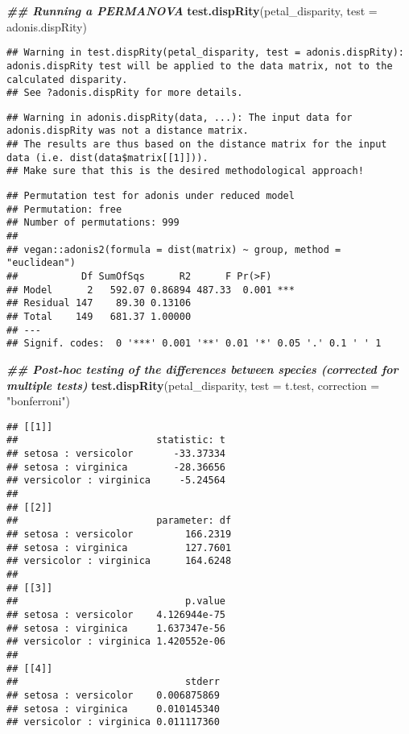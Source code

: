 \documentclass[
]{book}
\newenvironment{Shaded}{\begin{snugshade}}{\end{snugshade}}
\newcommand{\AttributeTok}[1]{\textcolor[rgb]{0.13,0.29,0.53}{#1}}
\newcommand{\DocumentationTok}[1]{\textcolor[rgb]{0.56,0.35,0.01}{\textbf{\textit{#1}}}}
\newcommand{\FunctionTok}[1]{\textcolor[rgb]{0.13,0.29,0.53}{\textbf{#1}}}
\newcommand{\NormalTok}[1]{#1}
\newcommand{\StringTok}[1]{\textcolor[rgb]{0.31,0.60,0.02}{#1}}
\begin{document}
\begin{Shaded}
\begin{Highlighting}[]
\DocumentationTok{\#\# Running a PERMANOVA}
\FunctionTok{test.dispRity}\NormalTok{(petal\_disparity, }\AttributeTok{test =}\NormalTok{ adonis.dispRity)}
\end{Highlighting}
\end{Shaded}

\begin{verbatim}
## Warning in test.dispRity(petal_disparity, test = adonis.dispRity): adonis.dispRity test will be applied to the data matrix, not to the calculated disparity.
## See ?adonis.dispRity for more details.
\end{verbatim}

\begin{verbatim}
## Warning in adonis.dispRity(data, ...): The input data for adonis.dispRity was not a distance matrix.
## The results are thus based on the distance matrix for the input data (i.e. dist(data$matrix[[1]])).
## Make sure that this is the desired methodological approach!
\end{verbatim}

\begin{verbatim}
## Permutation test for adonis under reduced model
## Permutation: free
## Number of permutations: 999
## 
## vegan::adonis2(formula = dist(matrix) ~ group, method = "euclidean")
##           Df SumOfSqs      R2      F Pr(>F)    
## Model      2   592.07 0.86894 487.33  0.001 ***
## Residual 147    89.30 0.13106                  
## Total    149   681.37 1.00000                  
## ---
## Signif. codes:  0 '***' 0.001 '**' 0.01 '*' 0.05 '.' 0.1 ' ' 1
\end{verbatim}

\begin{Shaded}
\begin{Highlighting}[]
\DocumentationTok{\#\# Post{-}hoc testing of the differences between species (corrected for multiple tests)}
\FunctionTok{test.dispRity}\NormalTok{(petal\_disparity, }\AttributeTok{test =}\NormalTok{ t.test, }\AttributeTok{correction =} \StringTok{"bonferroni"}\NormalTok{)}
\end{Highlighting}
\end{Shaded}

\begin{verbatim}
## [[1]]
##                        statistic: t
## setosa : versicolor       -33.37334
## setosa : virginica        -28.36656
## versicolor : virginica     -5.24564
## 
## [[2]]
##                        parameter: df
## setosa : versicolor         166.2319
## setosa : virginica          127.7601
## versicolor : virginica      164.6248
## 
## [[3]]
##                             p.value
## setosa : versicolor    4.126944e-75
## setosa : virginica     1.637347e-56
## versicolor : virginica 1.420552e-06
## 
## [[4]]
##                             stderr
## setosa : versicolor    0.006875869
## setosa : virginica     0.010145340
## versicolor : virginica 0.011117360
\end{verbatim}
\end{document}

